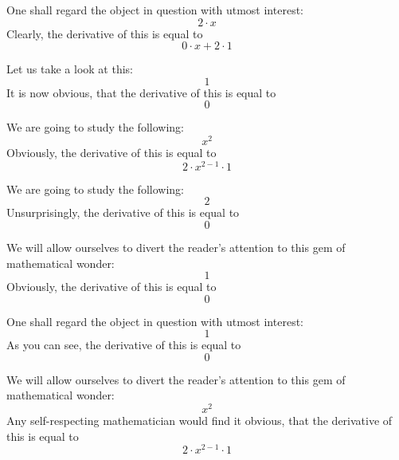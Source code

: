\documentclass{article}
\begin{document}
One shall regard the object in question with utmost interest:
\begin{equation}
2 \cdot x 
\end{equation}
Clearly, the derivative of this is equal to
\begin{equation}
0 \cdot x + 2 \cdot 1 
\end{equation}

Let us take a look at this:
\begin{equation}
1 
\end{equation}
It is now obvious, that the derivative of this is equal to
\begin{equation}
0 
\end{equation}

We are going to study the following:
\begin{equation}
x ^{2 } 
\end{equation}
Obviously, the derivative of this is equal to
\begin{equation}
2 \cdot x ^{2 - 1 } \cdot 1 
\end{equation}

We are going to study the following:
\begin{equation}
2 
\end{equation}
Unsurprisingly, the derivative of this is equal to
\begin{equation}
0 
\end{equation}

We will allow ourselves to divert the reader's attention to this gem of mathematical wonder:
\begin{equation}
1 
\end{equation}
Obviously, the derivative of this is equal to
\begin{equation}
0 
\end{equation}

One shall regard the object in question with utmost interest:
\begin{equation}
1 
\end{equation}
As you can see, the derivative of this is equal to
\begin{equation}
0 
\end{equation}

We will allow ourselves to divert the reader's attention to this gem of mathematical wonder:
\begin{equation}
x ^{2 } 
\end{equation}
Any self-respecting mathematician would find it obvious, that the derivative of this is equal to
\begin{equation}
2 \cdot x ^{2 - 1 } \cdot 1 
\end{equation}
\end{document}

